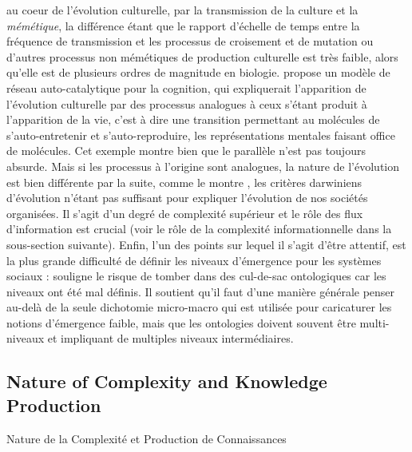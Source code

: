au coeur de l'évolution culturelle, par la transmission de la culture et la \emph{mémétique}, la différence étant que le rapport d'échelle de temps entre la fréquence de transmission et les processus de croisement et de mutation ou d'autres processus non mémétiques de production culturelle est très faible, alors qu'elle est de plusieurs ordres de magnitude en biologie. \cite{2017arXiv170305917G} propose un modèle de réseau auto-catalytique pour la cognition, qui expliquerait l'apparition de l'évolution culturelle par des processus analogues à ceux s'étant produit à l'apparition de la vie, c'est à dire une transition permettant au molécules de s'auto-entretenir et s'auto-reproduire, les représentations mentales faisant office de molécules. Cet exemple montre bien que le parallèle n'est pas toujours absurde. Mais si les processus à l'origine sont analogues, la nature de l'évolution est bien différente par la suite, comme le montre \cite{vanderLeeuw2009}, les critères darwiniens d'évolution n'étant pas suffisant pour expliquer l'évolution de nos sociétés organisées. Il s'agit d'un degré de complexité supérieur et le rôle des flux d'information est crucial (voir le rôle de la complexité informationnelle dans la sous-section suivante). Enfin, l'un des points sur lequel il s'agit d'être attentif, est la plus grande difficulté de définir les niveaux d'émergence pour les systèmes sociaux : \cite{roth2009reconstruction} souligne le risque de tomber dans des cul-de-sac ontologiques car les niveaux ont été mal définis. Il soutient qu'il faut d'une manière générale penser au-delà de la seule dichotomie micro-macro qui est utilisée pour caricaturer les notions d'émergence faible, mais que les ontologies doivent souvent être multi-niveaux et impliquant de multiples niveaux intermédiaires.






\subsection{Nature of Complexity and Knowledge Production}{Nature de la Complexité et Production de Connaissances}


